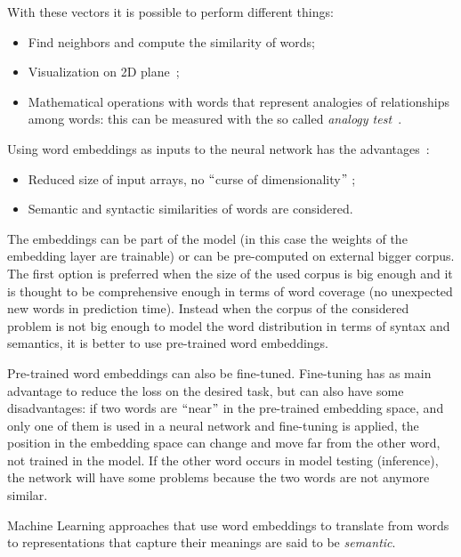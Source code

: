 With these vectors it is possible to perform different things:

\begin{itemize}
	\item Find neighbors and compute the similarity of words;

	\item Visualization on 2D plane~\cite{maaten2008visualizing};

	\item Mathematical operations with words that represent analogies of relationships among words: this can be measured with the so called \textit{analogy test~\cite{mikolov2013linguistic}}.
\end{itemize}

Using word embeddings as inputs to the neural network has the advantages~\cite{bengio2003neural}:

\begin{itemize}
	\item Reduced size of input arrays, no $``$curse of dimensionality$"$ ;

	\item Semantic and syntactic similarities of words are considered.
\end{itemize}

The embeddings can be part of the model (in this case the weights of the embedding layer are trainable) or can be pre-computed on external bigger corpus. The first option is preferred when the size of the used corpus is big enough and it is thought to be comprehensive enough in terms of word coverage (no unexpected new words in prediction time). Instead when the corpus of the considered problem is not big enough to model the word distribution in terms of syntax and semantics, it is better to use pre-trained word embeddings.

Pre-trained word embeddings can also be fine-tuned. Fine-tuning has as main advantage to reduce the loss on the desired task, but can also have some disadvantages: if two words are $``$near$"$  in the pre-trained embedding space, and only one of them is used in a neural network and fine-tuning is applied, the position in the embedding space can change and move far from the other word, not trained in the model. If the other word occurs in model testing (inference), the network will have some problems because the two words are not anymore similar.

Machine Learning approaches that use word embeddings to translate from words to representations that capture their meanings are said to be \textit{semantic}.

